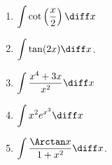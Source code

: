 \begin{multicols}{3}
\begin{enumerate}[ref={\fcProblemRef}]

\item $\displaystyle \int \cot \left(\frac{x}{2}\right) \diff x$


\item $\displaystyle\int \tan (2x) \diff x$.

\item ${\displaystyle \int \frac{x^4 + 3x}{x^2} \diff x}$


\item ${\displaystyle \int x^2 e^{x^3} \diff x}$

\item \label{problemIntArctan(x)/(1+x^2)dx} $\displaystyle\int \frac{\Arctan x}{1+x^2} \diff x$. 

\end{enumerate}
\end{multicols}